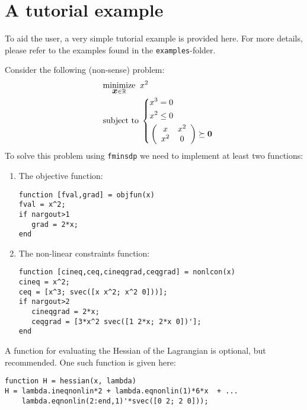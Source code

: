 \documentclass{article}
\newcommand{\bm}[1]{\mbox{\boldmath $#1$}}
\begin{document}
\section{A tutorial example}
\label{sec:tutorial}

To aid the user, a very simple tutorial example is provided here. For more details, please refer to the examples 
found in the \texttt{examples}-folder. 

Consider the following (non-sense) problem:
\begin{equation}\label{eq:tutorial}
\quad
	\begin{aligned}
    & \underset{\bm{x}\in\mathbb{R}}{\mbox{minimize}} \;\;  x^{2}  \\
	& \mbox{subject to} \;
	\left\{
		\begin{aligned}
			& x^{3} = 0 	\\
		    & x^{2} \leq 0			\\
			& \left(
			\begin{array}{cc}
					x   & x^2 \\
			        x^2 & 0
			      \end{array}
			\right) \succeq \bm{0}		
		\end{aligned}
		\right.
	\end{aligned}
\end{equation}
To solve this problem using \texttt{fminsdp} we need to implement at least two functions:

\begin{enumerate} 
\item The objective function:
\begin{verbatim}
function [fval,grad] = objfun(x)
fval = x^2;
if nargout>1 
   grad = 2*x;
end
\end{verbatim}

\item The non-linear constraints function:
\begin{verbatim}
function [cineq,ceq,cineqgrad,ceqgrad] = nonlcon(x)
cineq = x^2;
ceq = [x^3; svec([x x^2; x^2 0]))];
if nargout>2
   cineqgrad = 2*x;
   ceqgrad = [3*x^2 svec([1 2*x; 2*x 0])'];
end
\end{verbatim}

\end{enumerate}

\noindent A function for evaluating the Hessian of the Lagrangian is optional, but recommended. One
such function is given here:
\begin{verbatim}
function H = hessian(x, lambda)
H = lambda.ineqnonlin*2 + lambda.eqnonlin(1)*6*x  + ...
    lambda.eqnonlin(2:end,1)'*svec([0 2; 2 0]));
\end{verbatim}
\end{document}
